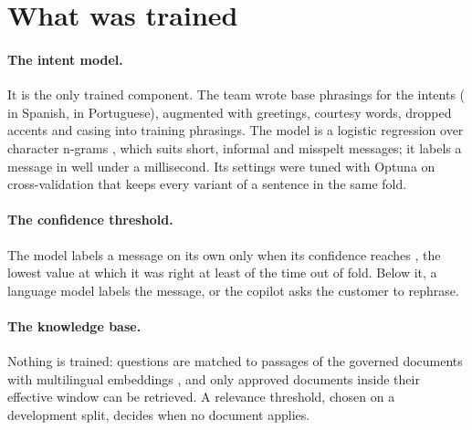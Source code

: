 \section{What was trained}

\paragraph{The intent model.} It is the only trained component. The team wrote  base
phrasings for the  intents ( in Spanish,  in
Portuguese), augmented with greetings, courtesy words, dropped accents and casing into 
training phrasings. The model is a logistic regression over character n-grams \parencite{pedregosa2011}, which suits
short, informal and misspelt messages; it labels a message in well under a millisecond. Its settings were tuned with
Optuna \parencite{akiba2019} on cross-validation that keeps every variant of a sentence in the same fold.

\paragraph{The confidence threshold.} The model labels a message on its own only when its confidence reaches
, the lowest value at which it was right at least  of the
time out of fold. Below it, a language model labels the message, or the copilot asks the customer to rephrase.

\paragraph{The knowledge base.} Nothing is trained: questions are matched to passages of the governed documents with
multilingual embeddings \parencite{wang2024e5}, and only approved documents inside their effective window can be
retrieved. A relevance threshold, chosen on a development split, decides when no document applies.

